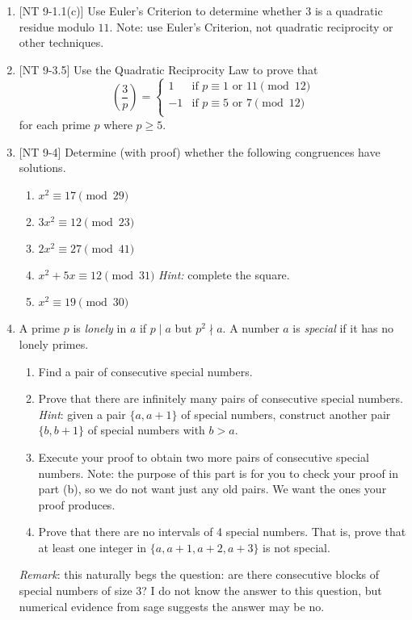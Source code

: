 \documentclass[11pt]{article}
\begin{document}
\begin{enumerate}

\item {}[NT 9-1.1(c)] Use Euler's Criterion to determine whether $3$ is a quadratic residue modulo $11$.  Note: use Euler's Criterion, not quadratic reciprocity or other techniques.

\item {}[NT 9-3.5] Use the Quadratic Reciprocity Law to prove that 
\[ \left(\frac{3}{p}\right) =
\begin{cases}
	1 & \mbox{if $p\equiv 1$ or $11 \pmod{12}$}\\
	-1 & \mbox{if $p\equiv 5$ or $7 \pmod{12}$}\\
\end{cases}
\] 
for each prime $p$ where $p\ge 5$.
\item {}[NT 9-4]
Determine (with proof) whether the following congruences have solutions. 
\begin{enumerate}
\item $x^2\equiv 17\pmod{29}$
\item $3x^2\equiv 12\pmod{23}$
\item $2x^2\equiv 27\pmod{41}$
\item $x^2 + 5x\equiv 12\pmod{31}$  \textit{Hint:} complete the square.
\item $x^2\equiv 19\pmod{30}$
\end{enumerate}

\item {} A prime $p$ is \emph{lonely} in $a$ if $p \mid a$ but $p^2 \nmid a$.  A number $a$ is \emph{special} if it has no lonely primes.
\begin{enumerate}
\item Find a pair of consecutive special numbers.
\item Prove that there are infinitely many pairs of consecutive special numbers.  \emph{Hint}: given a pair $\{a,a+1\}$ of special numbers, construct another pair $\{b,b+1\}$ of special numbers with $b>a$.
\item Execute your proof to obtain two more pairs of consecutive special numbers.  Note: the purpose of this part is for you to check your proof in part (b), so we do not want just any old pairs.  We want the ones your proof produces.
\item Prove that there are no intervals of 4 special numbers.  That is, prove that at least one integer in $\{a,a+1,a+2,a+3\}$ is not special.
\end{enumerate}
\emph{Remark}: this naturally begs the question: are there consecutive blocks of special numbers of size $3$?  I do not know the answer to this question, but numerical evidence from sage suggests the answer may be no.


\end{enumerate}
\end{document}
